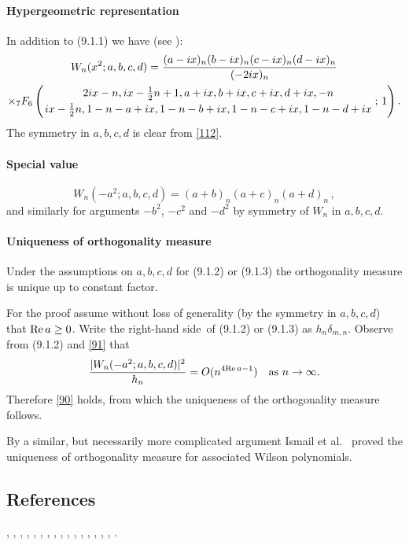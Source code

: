 \documentclass[envcountchap,graybox]{svmono}
\newcounter{rom}
\newcommand{\hyp}[5]{\mbox{}_{#1}{F}_{#2}
\left(\genfrac{}{}{0pt}{}{#3}{#4}\,;\,#5\right)}
\newcommand\de\delta
\newcommand\thalf{\tfrac12}
\newcommand\iy\infty
\newcommand\RHS{right-hand side}
\renewcommand\Re{{\rm Re}\,}
\begin{document}
\paragraph{Hypergeometric representation}
In addition to (9.1.1) we have (see ):
\begin{multline}
W_n(x^2;a,b,c,d)
=\frac{(a-ix)_n (b-ix)_n (c-ix)_n (d-ix)_n}{(-2ix)_n}\\
\times\hyp76{2ix-n,ix-\thalf n+1,a+ix,b+ix,c+ix,d+ix,-n}
{ix-\thalf n,1-n-a+ix,1-n-b+ix,1-n-c+ix,1-n-d+ix}1.
\label{112}
\end{multline}
The symmetry in $a,b,c,d$ is clear from \eqref{112}.
%
\paragraph{Special value}
\begin{equation}
W_n(-a^2;a,b,c,d)=(a+b)_n(a+c)_n(a+d)_n\,,
\label{91}
\end{equation}
and similarly for arguments $-b^2$, $-c^2$ and
$-d^2$ by symmetry of $W_n$ in $a,b,c,d$.
%
\paragraph{Uniqueness of orthogonality measure}
Under the assumptions on $a,b,c,d$ for (9.1.2) or (9.1.3) the orthogonality
measure is unique up to constant factor.

For the proof assume without
loss of generality (by the symmetry in $a,b,c,d$) that $\Re a\ge0$.
Write the \RHS\ of (9.1.2) or (9.1.3) as $h_n\de_{m,n}$.
Observe from (9.1.2) and \eqref{91} that
\[
\frac{|W_n(-a^2;a,b,c,d)|^2}{h_n} = O(n^{4\Re a-1})\quad\hbox{as $n\to\iy$.}
\]
Therefore \eqref{90} holds, from which the uniqueness of the orthogonality
measure follows.

By a similar, but necessarily more complicated argument Ismail et al.\
 proved the uniqueness of orthogonality measure for
associated Wilson polynomials.
%

\subsection*{References}
\cite{Askey89I}, \cite{AskeyWilson82}, \cite{AskeyWilson85}, \cite{AtakRahmanSuslov},
\cite{Ismail2005II}, \cite{IsmailLetMasVal}, \cite{IsmailLetValWimp90},
\cite{IsmailLetValWimp91}, \cite{Koorn85}, \cite{Koorn88}, \cite{LeskyWaibel},
\cite{Masson91}, \cite{Miller87}, \cite{MimachiII}, \cite{ValentAssche}, \cite{Wilson80}, 
\cite{Wilson91}.
\end{document}
